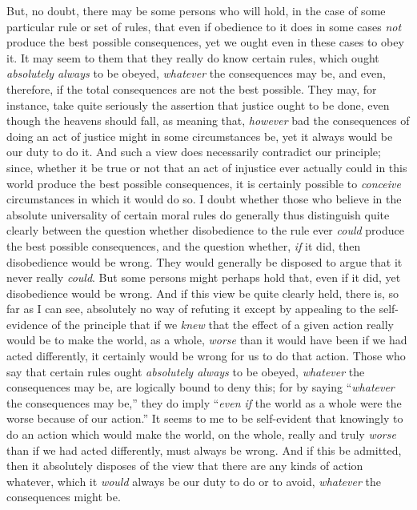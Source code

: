 But, no doubt, there may be some persons who will hold, in the case of
some particular rule or set of rules, that even if obedience to it
does in some cases \textit{not} produce the best possible
consequences, yet we ought even in these cases to obey it. It may seem
to them that they really do know certain rules, which ought
\textit{absolutely always} to be obeyed, \textit{whatever} the
consequences may be, and even,  therefore, if the total
consequences are not the best possible. They may, for instance, take
quite seriously the assertion that justice ought to be done, even
though the heavens should fall, as meaning that, \textit{however} bad
the consequences of doing an act of justice might in some
circumstances be, yet it always would be our duty to do it. And such a
view does necessarily contradict our principle; since, whether it be
true or not that an act of injustice ever actually could in this world
produce the best possible consequences, it is certainly possible to
\textit{conceive} circumstances in which it would do so. I doubt
whether those who believe in the absolute universality of certain
moral rules do generally thus distinguish quite clearly between the
question whether disobedience to the rule ever \textit{could} produce
the best possible consequences, and the question whether, \textit{if}
it did, then disobedience would be wrong. They would generally be
disposed to argue that it never really \textit{could}. But some
persons might perhaps hold that, even if it did, yet disobedience
would be wrong. And if this view be quite clearly held, there
 is, so far as I can see, absolutely no way of refuting it
except by appealing to the self-evidence of the principle that if we
\textit{knew} that the effect of a given action really would be to
make the world, as a whole, \textit{worse} than it would have been if
we had acted differently, it certainly would be wrong for us to do
that action. Those who say that certain rules ought \textit{absolutely
always} to be obeyed, \textit{whatever} the consequences may be, are
logically bound to deny this; for by saying ``\textit{whatever} the
consequences may be,'' they do imply ``\textit{even if} the world as a
whole were the worse because of our action.'' It seems to me to be
self-evident that knowingly to do an action which would make the
world, on the whole, really and truly \textit{worse} than if we had
acted differently, must always be wrong. And if this be admitted, then
it absolutely disposes of the view that there are any kinds of action
whatever, which it \textit{would} always be our duty to do or to
avoid, \textit{whatever} the consequences might be.

